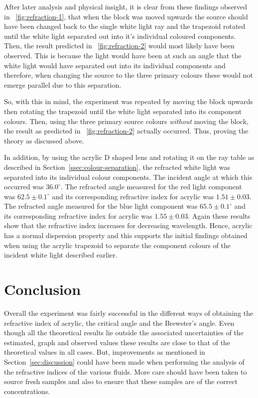 \documentclass{article}
\newcommand{\figref}[2][\figurename~]{#1\ref{#2}}
\newcommand{\secref}[2][Section~]{#1\ref{#2}}
\begin{document}
\noindent
After later analysis and physical insight, it is clear from these findings observed in \figref{fig:refraction-1}, that when the block was moved upwards the source should have been changed back to the single white light ray and the trapezoid rotated until the white light separated out into it's individual coloured components. Then, the result predicted in \figref{fig:refraction-2} would most likely have been observed. This is because the light would have been at such an angle that the white light would have separated out into its individual components and therefore, when changing the source to the three primary colours these would not emerge parallel due to this separation. 

\vspace{2mm}
\noindent
So, with this in mind, the experiment was repeated by moving the block upwards then rotating the trapezoid until the white light separated into its component colours. Then, using the three primary source colours \textit{without} moving the block, the result as predicted in \figref{fig:refraction-2} actually occurred. Thus, proving the theory as discussed above.

\vspace{2mm}
\noindent
In addition, by using the acrylic D shaped lens and rotating it on the ray table as described in \secref{ssec:colour-separation}, the refracted white light was separated into its individual colour components. The incident angle at which this occurred was $36.0^{\circ}$. The refracted angle measured for the red light component was $62.5\pm0.1^{\circ}$ and its corresponding refractive index for acrylic was $1.51\pm0.03$. The refracted angle measured for the blue light component was $65.5\pm0.1^{\circ}$ and its corresponding refractive index for acrylic was $1.55\pm0.03$. Again these results show that the refractive index increases for decreasing wavelength. Hence, acrylic has a normal dispersion property and this supports the initial findings obtained when using the acrylic trapezoid to separate the component colours of the incident white light described earlier.

\vspace{2mm}
\noindent


\section{Conclusion}
\label{sec:conclusion}

Overall the experiment was fairly successful in the different ways of obtaining the refractive index of acrylic, the critical angle and the Brewster's angle. Even though all the theoretical results lie outside the associated uncertainties of the estimated, graph and observed values these results are close to that of the theoretical values in all cases. But, improvements as mentioned in \secref{sec:discussion} could have been made when performing the analysis of the refractive indices of the various fluids. More care should have been taken to source fresh samples and also to ensure that these samples are of the correct concentrations.
\end{document}
